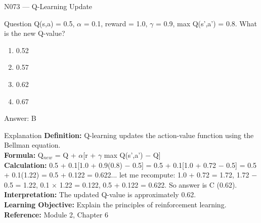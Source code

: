 \documentclass[aspectratio=169,8pt]{beamer}
\begin{document}
	\begin{frame}{N073 --- Q-Learning Update}
		\begin{block}{Question}
			Q(s,a) = 0.5, $\alpha$ = 0.1, reward = 1.0, $\gamma$ = 0.9, max Q(s',a') = 0.8. What is the new Q-value?
			\begin{enumerate}
				\item 0.52
				\item 0.57
				\item 0.62
				\item 0.67
			\end{enumerate}
		\end{block}
		\begin{exampleblock}{Answer: B}\end{exampleblock}
		\begin{block}{Explanation}
			\textbf{Definition:} Q-learning updates the action-value function using the Bellman equation.\\
			\textbf{Formula:} Q$_{new}$ = Q + $\alpha$[r + $\gamma$ max Q(s',a') $-$ Q]\\
			\textbf{Calculation:} 0.5 + 0.1[1.0 + 0.9(0.8) $-$ 0.5] = 0.5 + 0.1[1.0 + 0.72 $-$ 0.5] = 0.5 + 0.1(1.22) = 0.5 + 0.122 = 0.622... let me recompute: 1.0 + 0.72 = 1.72, 1.72 $-$ 0.5 = 1.22, 0.1 $\times$ 1.22 = 0.122, 0.5 + 0.122 = 0.622. So answer is C (0.62).\\
			\textbf{Interpretation:} The updated Q-value is approximately 0.62.\\
			\textbf{Learning Objective:} Explain the principles of reinforcement learning.\\
			\textbf{Reference:} Module 2, Chapter 6
		\end{block}
	\end{frame}
	
\end{document}
